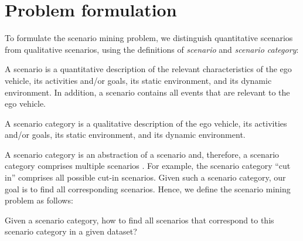 \section{Problem formulation}
\label{sec:problem}

To formulate the scenario mining problem, we distinguish quantitative scenarios from qualitative scenarios, using the definitions of \emph{scenario} and \emph{scenario category}:

\begin{definition}
	\label{def:scenario}
	A scenario is a quantitative description of the relevant characteristics of the ego vehicle, its activities and/or goals, its static environment, and its dynamic environment. In addition, a scenario contains all events that are relevant to the ego vehicle.
\end{definition}

\begin{definition}
	\label{def:scenario category}
	A scenario category is a qualitative description of the ego vehicle, its activities and/or goals, its static environment, and its dynamic environment.
\end{definition}

\cstarta
A scenario category is an abstraction of a scenario and, therefore, a scenario category comprises multiple scenarios \autocite{degelder2018ontology}.
For example, the scenario category ``cut in'' comprises all possible cut-in scenarios. 
Given such a scenario category, our goal is to find all corresponding scenarios. 
Hence, we define the scenario mining problem as follows:
\begin{problem}
	Given a scenario category, how to find all scenarios that correspond to this scenario category in a given dataset?
\end{problem}
\cenda

